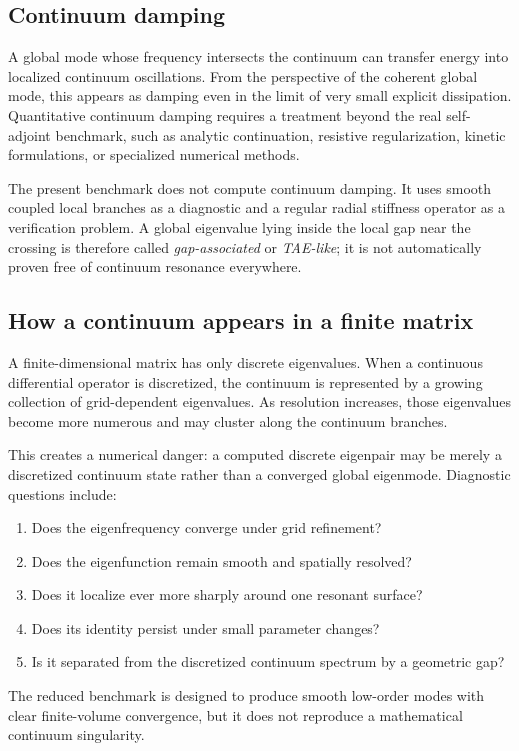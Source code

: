 \subsection{Continuum damping}
A global mode whose frequency intersects the continuum can transfer energy into localized continuum oscillations. From the perspective of the coherent global mode, this appears as damping even in the limit of very small explicit dissipation. Quantitative continuum damping requires a treatment beyond the real self-adjoint benchmark, such as analytic continuation, resistive regularization, kinetic formulations, or specialized numerical methods.

The present benchmark does not compute continuum damping. It uses smooth coupled local branches as a diagnostic and a regular radial stiffness operator as a verification problem. A global eigenvalue lying inside the local gap near the crossing is therefore called \emph{gap-associated} or \emph{TAE-like}; it is not automatically proven free of continuum resonance everywhere.

\subsection{How a continuum appears in a finite matrix}
A finite-dimensional matrix has only discrete eigenvalues. When a continuous differential operator is discretized, the continuum is represented by a growing collection of grid-dependent eigenvalues. As resolution increases, those eigenvalues become more numerous and may cluster along the continuum branches.

This creates a numerical danger: a computed discrete eigenpair may be merely a discretized continuum state rather than a converged global eigenmode. Diagnostic questions include:
\begin{enumerate}[leftmargin=1.6em]
\item Does the eigenfrequency converge under grid refinement?
\item Does the eigenfunction remain smooth and spatially resolved?
\item Does it localize ever more sharply around one resonant surface?
\item Does its identity persist under small parameter changes?
\item Is it separated from the discretized continuum spectrum by a geometric gap?
\end{enumerate}
The reduced benchmark is designed to produce smooth low-order modes with clear finite-volume convergence, but it does not reproduce a mathematical continuum singularity.

